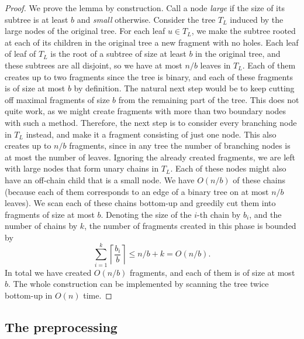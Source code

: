 \documentclass[11pt,a4paper]{article}
\theoremstyle{definition}
\theoremstyle{remark}
\begin{document}
\begin{proof}
We prove the lemma by construction. Call a node \textit{large} if the size of its subtree is at least $b$
and \textit{small} otherwise. Consider the tree $T_L$ induced by the large nodes of the original tree. 
For each leaf $u\in T_{L}$, we make the subtree rooted at each of its children in the original tree a new fragment with no holes.
Each leaf of leaf of $T_{L}$ is the root of a subtree of size at least $b$ in the original tree, and these subtrees
are all disjoint, so we have at most $n/b$ leaves in $T_{L}$. Each of them creates up to two fragments
since the tree is binary, and each of these fragments is of size at most $b$ by definition.
The natural next step would be to keep cutting off maximal fragments of size $b$ from the remaining
part of the tree. This does not quite work, as we might create fragments with more than two boundary
nodes with such a method.
Therefore, the next step is to consider every branching node in $T_{L}$ instead, and make it a fragment
consisting of just one node. This also creates up to $n/b$ fragments, since in any tree the number of
branching nodes is at most the number of leaves.
Ignoring the already created fragments, we are left with large nodes that form unary chains in $T_{L}$.
Each of these nodes might also have an off-chain child that is a small node. We have $O(n/b)$ of these chains
(because each of them corresponds to an edge of a binary tree on at most $n/b$ leaves).
We scan each of these chains bottom-up and greedily cut them into fragments of size at most $b$.
Denoting the size of the $i$-th chain by $b_{i}$, and the number of chains by $k$, the number of fragments created in this phase is
bounded by $$\sum_{i=1}^{k} \left\lceil \frac{b_i}{b} \right\rceil \leq n/b+k=O(n/b).$$
In total we have created $O(n/b)$ fragments, and each of them is of size at most $b$.
The whole construction can be implemented by scanning the tree twice bottom-up in $O(n)$ time.
\end{proof}



\subsection{The preprocessing} \label{Pre-Processing Fragments}
\end{document}
